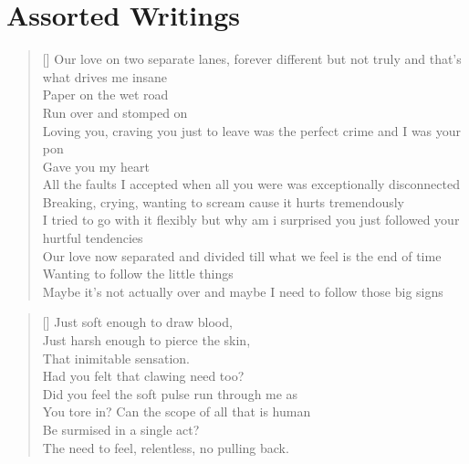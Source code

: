 \chapter{Assorted Writings}

\settowidth{\versewidth}{Breaking, crying, wanting to scream cause it hurts tremendously}
\begin{verse}[\versewidth]
    Our love on two separate lanes, forever different but not truly and that’s what drives me insane\\
    Paper on the wet road\\
    Run over and stomped on\\
    Loving you, craving you just to leave was the perfect crime and I was your pon\\
    Gave you my heart\\
    All the faults I accepted when all you were was exceptionally disconnected\\
    Breaking, crying, wanting to scream cause it hurts tremendously \\
    I tried to go with it flexibly but why am i surprised you just followed your hurtful tendencies \\
    Our love now separated and divided till what we feel is the end of time \\
    Wanting to follow the little things \\
    Maybe it’s not actually over and maybe I need to follow those big signs\\ 
\end{verse}

\settowidth{\versewidth}{You tore in? Can the scope of all that is human}
\begin{verse}[\versewidth]
    Just soft enough to draw blood, \\
    Just harsh enough to pierce the skin, \\
    That inimitable sensation. \\
    Had you felt that clawing need too?\\
    Did you feel the soft pulse run through me as\\
    You tore in? Can the scope of all that is human \\
    Be surmised in a single act?\\
    The need to feel, relentless, no pulling back.   \\  
\end{verse}

